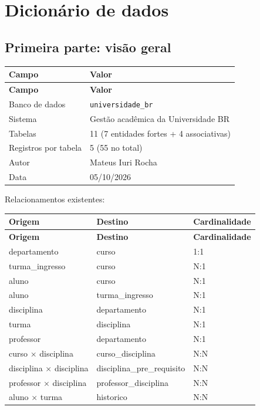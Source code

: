 \documentclass[12pt,a4paper]{article}
\begin{document}


\section{Dicionário de dados}
\label{sec:dicionario}

\subsection{Primeira parte: visão geral}

\begin{longtable}{@{}ll@{}}
\toprule
\textbf{Campo} & \textbf{Valor} \\
\midrule
\endfirsthead
\toprule
\textbf{Campo} & \textbf{Valor} \\
\midrule
\endhead
Banco de dados & \texttt{universidade\_br} \\
Sistema & Gestão acadêmica da Universidade BR \\
Tabelas & 11 (7 entidades fortes + 4 associativas) \\
Registros por tabela & 5 (55 no total) \\
Autor & Mateus Iuri Rocha \\
Data & 05/10/2026 \\
\bottomrule
\end{longtable}

Relacionamentos existentes:

\begin{longtable}{@{}lll@{}}
\toprule
\textbf{Origem} & \textbf{Destino} & \textbf{Cardinalidade} \\
\midrule
\endfirsthead
\toprule
\textbf{Origem} & \textbf{Destino} & \textbf{Cardinalidade} \\
\midrule
\endhead
departamento & curso & 1:1 \\
turma\_ingresso & curso & N:1 \\
aluno & curso & N:1 \\
aluno & turma\_ingresso & N:1 \\
disciplina & departamento & N:1 \\
turma & disciplina & N:1 \\
professor & departamento & N:1 \\
curso $\times$ disciplina & curso\_disciplina & N:N \\
disciplina $\times$ disciplina & disciplina\_pre\_requisito & N:N \\
professor $\times$ disciplina & professor\_disciplina & N:N \\
aluno $\times$ turma & historico & N:N \\
\bottomrule
\end{longtable}
\end{document}
